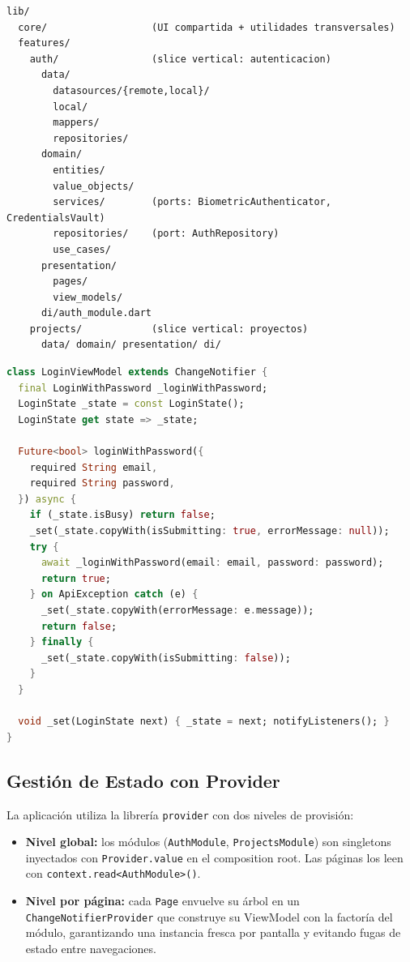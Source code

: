 \documentclass[12pt, a4paper]{article} %
\begin{document}
\begin{lstlisting}[language={}, caption={Estructura de carpetas (Screaming + Vertical Slicing)}]
lib/
  core/                  (UI compartida + utilidades transversales)
  features/
    auth/                (slice vertical: autenticacion)
      data/
        datasources/{remote,local}/
        local/
        mappers/
        repositories/
      domain/
        entities/
        value_objects/
        services/        (ports: BiometricAuthenticator, CredentialsVault)
        repositories/    (port: AuthRepository)
        use_cases/
      presentation/
        pages/
        view_models/
      di/auth_module.dart
    projects/            (slice vertical: proyectos)
      data/ domain/ presentation/ di/
\end{lstlisting}

\begin{lstlisting}[language=Dart, caption={ViewModel MVVM con estado inmutable}]
class LoginViewModel extends ChangeNotifier {
  final LoginWithPassword _loginWithPassword;
  LoginState _state = const LoginState();
  LoginState get state => _state;

  Future<bool> loginWithPassword({
    required String email,
    required String password,
  }) async {
    if (_state.isBusy) return false;
    _set(_state.copyWith(isSubmitting: true, errorMessage: null));
    try {
      await _loginWithPassword(email: email, password: password);
      return true;
    } on ApiException catch (e) {
      _set(_state.copyWith(errorMessage: e.message));
      return false;
    } finally {
      _set(_state.copyWith(isSubmitting: false));
    }
  }

  void _set(LoginState next) { _state = next; notifyListeners(); }
}
\end{lstlisting}

\subsection{Gestión de Estado con Provider}
\label{sec:provider}
La aplicación utiliza la librería \texttt{provider} con dos niveles de
provisión:

\begin{itemize}
    \item \textbf{Nivel global:} los módulos
    (\texttt{AuthModule}, \texttt{ProjectsModule}) son singletons
    inyectados con \texttt{Provider.value} en el composition root. Las
    páginas los leen con \texttt{context.read<AuthModule>()}.
    \item \textbf{Nivel por página:} cada \texttt{Page} envuelve su
    árbol en un \texttt{ChangeNotifierProvider} que construye su
    ViewModel con la factoría del módulo, garantizando una instancia
    fresca por pantalla y evitando fugas de estado entre
    navegaciones.
\end{itemize}
\end{document}
